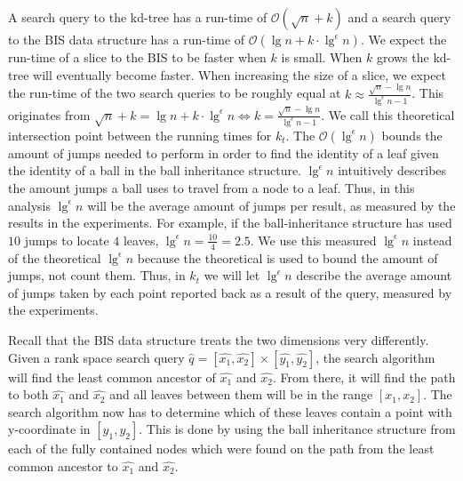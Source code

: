 A search query to the kd-tree has a run-time of $\mathcal{O}(\sqrt{n}+k)$ and a search query to the BIS data structure has a run-time of $\mathcal{O}(\lg n + k \cdot \lg^\epsilon n)$. We expect the run-time of a slice to the BIS to be faster when $k$ is small. When $k$ grows the kd-tree will eventually become faster. When increasing the size of a slice, we expect the run-time of the two search queries to be roughly equal at $k \approx \frac{\sqrt{n} - \lg n}{\lg^\epsilon n - 1}$. This originates from $\sqrt{n} + k = \lg n + k \cdot \lg^\epsilon n \Leftrightarrow k = \frac{\sqrt{n} - \lg n}{\lg^\epsilon n - 1}$. We call this theoretical intersection point between the running times for $k_t$. The $\mathcal{O}(\lg^\epsilon n)$ bounds the amount of jumps needed to perform in order to find the identity of a leaf given the identity of a ball in the ball inheritance structure. $\lg^\epsilon n$ intuitively describes the amount jumps a ball uses to travel from a node to a leaf. Thus, in this analysis $\lg^\epsilon n$ will be the average amount of jumps per result, as measured by the results in the experiments. For example, if the ball-inheritance structure has used $10$ jumps to locate $4$ leaves, $\lg^\epsilon n = \frac{10}{4} = 2.5$. We use this measured $\lg^\epsilon n$ instead of the theoretical $\lg^\epsilon n$ because the theoretical is used to bound the amount of jumps, not count them. Thus, in $k_t$ we will let $\lg^\epsilon n$ describe the average amount of jumps taken by each point reported back as a result of the query, measured by the experiments.

Recall that the BIS data structure treats the two dimensions very differently. Given a rank space search query $\hat{q} = [\hat{x_1}, \hat{x_2}] \times [\hat{y_1}, \hat{y_2}]$, the search algorithm will find the least common ancestor of $\hat{x_1}$ and $\hat{x_2}$. From there, it will find the path to both $\hat{x_1}$ and $\hat{x_2}$ and all leaves between them will be in the range $[x_1, x_2]$. The search algorithm now has to determine which of these leaves contain a point with y-coordinate in $[y_1, y_2]$. This is done by using the ball inheritance structure from each of the fully contained nodes which were found on the path from the least common ancestor to $\hat{x_1}$ and $\hat{x_2}$.

